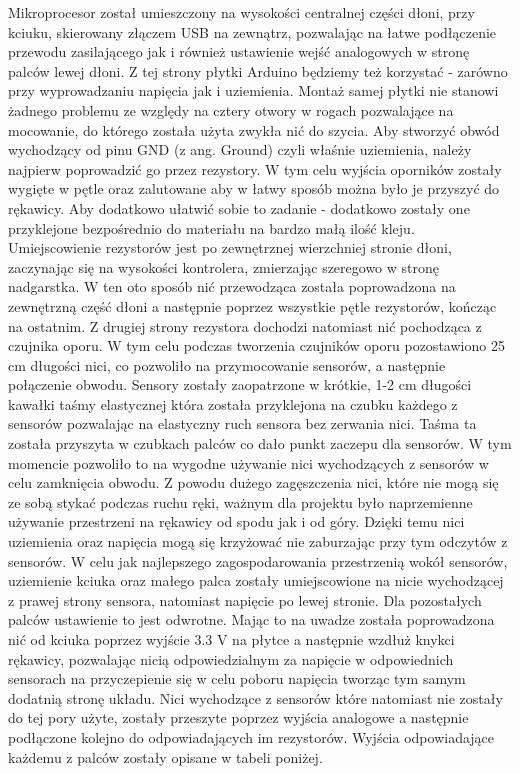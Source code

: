 Mikroprocesor został umieszczony na wysokości centralnej części dłoni, przy kciuku, skierowany złączem USB na zewnątrz, pozwalając na łatwe podłączenie przewodu zasilającego jak i również ustawienie wejść analogowych w stronę palców lewej dłoni. Z tej strony płytki Arduino będziemy też korzystać - zarówno przy wyprowadzaniu napięcia jak i uziemienia. Montaż samej płytki nie stanowi żadnego problemu ze względy na cztery otwory w rogach pozwalające na mocowanie, do którego została użyta zwykła nić do szycia. Aby stworzyć obwód wychodzący od pinu GND (z ang. Ground) czyli właśnie uziemienia, należy najpierw poprowadzić go przez rezystory. W tym celu wyjścia oporników zostały wygięte w pętle oraz zalutowane aby w łatwy sposób można było je przyszyć do rękawicy. Aby dodatkowo ułatwić sobie to zadanie - dodatkowo zostały one przyklejone bezpośrednio do materiału na bardzo małą ilość kleju. Umiejscowienie rezystorów jest po zewnętrznej wierzchniej stronie dłoni, zaczynając się na wysokości kontrolera, zmierzając szeregowo w stronę nadgarstka. W ten oto sposób nić przewodząca została poprowadzona na zewnętrzną część dłoni a następnie poprzez wszystkie pętle rezystorów, kończąc na ostatnim. Z drugiej strony rezystora dochodzi natomiast nić pochodząca z czujnika oporu. W tym celu podczas tworzenia czujników oporu pozostawiono 25 cm długości nici, co pozwoliło na przymocowanie sensorów, a następnie połączenie obwodu. Sensory zostały zaopatrzone w krótkie, 1-2 cm długości kawałki taśmy elastycznej która została przyklejona na czubku każdego z sensorów pozwalając na elastyczny ruch sensora bez zerwania nici. Taśma ta została przyszyta w czubkach palców co dało punkt zaczepu dla sensorów. W tym momencie pozwoliło to na wygodne używanie nici wychodzących z sensorów w celu zamknięcia obwodu. Z powodu dużego zagęszczenia nici, które nie mogą się ze sobą stykać podczas ruchu ręki, ważnym dla projektu było naprzemienne używanie przestrzeni na rękawicy od spodu jak i od góry. Dzięki temu nici uziemienia oraz napięcia mogą się krzyżować nie zaburzając przy tym odczytów z sensorów. W celu jak najlepszego zagospodarowania przestrzenią wokół sensorów, uziemienie kciuka oraz małego palca zostały umiejscowione na nicie wychodzącej z prawej strony sensora, natomiast napięcie po lewej stronie. Dla pozostałych palców ustawienie to jest odwrotne. Mając to na uwadze została poprowadzona nić od kciuka poprzez wyjście 3.3 V na płytce a następnie wzdłuż knykci rękawicy, pozwalając nicią odpowiedzialnym za napięcie w odpowiednich sensorach na przyczepienie się w celu poboru napięcia tworząc tym samym dodatnią stronę układu. Nici wychodzące z sensorów które natomiast nie zostały do tej pory użyte, zostały przeszyte poprzez wyjścia analogowe a następnie podłączone kolejno do odpowiadających im rezystorów. Wyjścia odpowiadające każdemu z palców zostały opisane w tabeli poniżej. 

